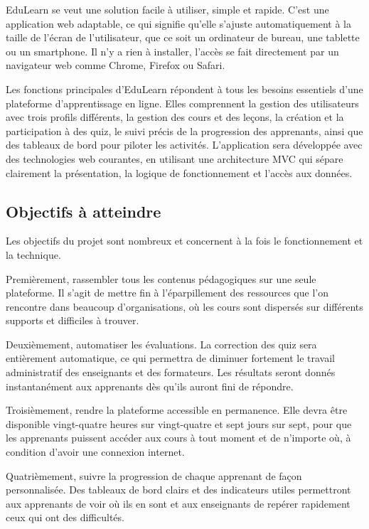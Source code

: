 \documentclass[12pt,a4paper]{report}
\begin{document}
EduLearn se veut une solution facile à utiliser, simple et rapide. C'est une application web adaptable, ce qui signifie qu'elle s'ajuste automatiquement à la taille de l'écran de l'utilisateur, que ce soit un ordinateur de bureau, une tablette ou un smartphone. Il n'y a rien à installer, l'accès se fait directement par un navigateur web comme Chrome, Firefox ou Safari.

Les fonctions principales d'EduLearn répondent à tous les besoins essentiels d'une plateforme d'apprentissage en ligne. Elles comprennent la gestion des utilisateurs avec trois profils différents, la gestion des cours et des leçons, la création et la participation à des quiz, le suivi précis de la progression des apprenants, ainsi que des tableaux de bord pour piloter les activités. L'application sera développée avec des technologies web courantes, en utilisant une architecture MVC qui sépare clairement la présentation, la logique de fonctionnement et l'accès aux données.

\subsection{Objectifs à atteindre}
Les objectifs du projet sont nombreux et concernent à la fois le fonctionnement et la technique.

Premièrement, rassembler tous les contenus pédagogiques sur une seule plateforme. Il s'agit de mettre fin à l'éparpillement des ressources que l'on rencontre dans beaucoup d'organisations, où les cours sont dispersés sur différents supports et difficiles à trouver.

Deuxièmement, automatiser les évaluations. La correction des quiz sera entièrement automatique, ce qui permettra de diminuer fortement le travail administratif des enseignants et des formateurs. Les résultats seront donnés instantanément aux apprenants dès qu'ils auront fini de répondre.

Troisièmement, rendre la plateforme accessible en permanence. Elle devra être disponible vingt-quatre heures sur vingt-quatre et sept jours sur sept, pour que les apprenants puissent accéder aux cours à tout moment et de n'importe où, à condition d'avoir une connexion internet.

Quatrièmement, suivre la progression de chaque apprenant de façon personnalisée. Des tableaux de bord clairs et des indicateurs utiles permettront aux apprenants de voir où ils en sont et aux enseignants de repérer rapidement ceux qui ont des difficultés.
\end{document}
